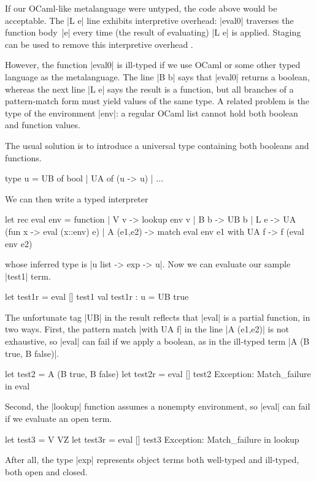 \documentclass[preprint]{sigplanconf}
\let\cite=\citep
\begin{document}
If our OCaml-like metalanguage were untyped, the code above would be acceptable.
The |L e| line exhibits interpretive overhead:
|eval0| traverses the function body~|e| every time (the result of
evaluating) |L e| is applied. Staging can be used to remove this
interpretive overhead \cite[\S1.1--2]{WalidICFP02}.

However, the function |eval0| is ill-typed
if we use OCaml or some other typed language as the metalanguage.
The line |B b|
says that |eval0| returns a boolean, whereas the next line |L e| says
the result is a function, but all branches of a pattern-match form must
yield values of the same type. 
A related problem is the type of the environment |env|: a regular
OCaml list cannot hold both boolean and function values. 

The usual solution is to introduce a universal type \citep[\S1.3]
{WalidICFP02} containing both booleans and functions.
\begin{code}
type u = UB of bool | UA of (u -> u) | ...
\end{code}
We can then write a typed interpreter
\begin{code}
let rec eval env = function
| V v       -> lookup env v
| B b       -> UB b
| L e       -> UA (fun x -> eval (x::env) e)
| A (e1,e2) -> match eval env e1 with UA f ->
               f (eval env e2)
\end{code}
whose inferred type is |u list -> exp -> u|. Now we can evaluate
our sample |test1| term.
\begin{code}
let test1r = eval [] test1
val test1r : u = UB true 
\end{code}

The unfortunate tag |UB| in the result reflects that |eval| is a partial
function, in two ways.  First, the pattern match |with UA f| in the line
|A (e1,e2)| is not exhaustive, so |eval| can fail if we apply a boolean,
as in the ill-typed term |A (B true, B false)|.
\begin{code}
let test2 = A (B true, B false)
let test2r = eval [] test2
Exception: Match_failure in eval
\end{code}
Second, the |lookup|
function assumes a nonempty environment, so |eval| can fail if we
evaluate an open term.
\begin{code}
let test3 = V VZ
let test3r = eval [] test3
Exception: Match_failure in lookup
\end{code}
After all, the type |exp| represents object
terms both well-typed and ill-typed, both open and closed.
\end{document}
